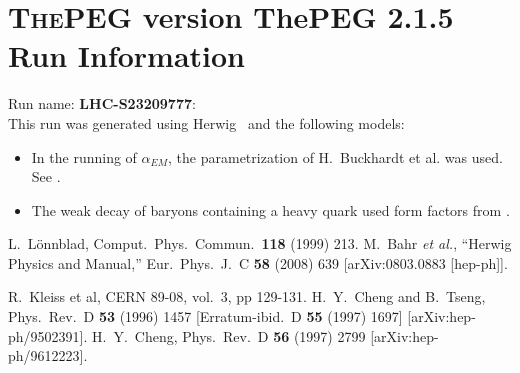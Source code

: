 \documentclass{article}
\begin{document}
\appendix
\section[xxx]{\textsc{ThePEG} version ThePEG 2.1.5 \cite{ThePEG} Run Information}
Run name: \textbf{LHC-S23209777}:\\
This run was generated using Herwig~\cite{Bahr:2008pv} and the following models:
\begin{itemize}
\item In the running of $\alpha_{EM}$, the parametrization of H.~Buckhardt et al. was used. See \cite{KLEISSCERN9808v3pp129}.
\item The weak decay of baryons containing a heavy quark used form factors from \cite{Cheng:1995fe,Cheng:1996cs}.
\end{itemize}

\begin{thebibliography}{99}
 L.~L\"onnblad, Comput.~Phys.~Commun.\ {\bf 118} (1999) 213.
  M.~Bahr {\it et al.},
  ``Herwig Physics and Manual,''
  Eur.\ Phys.\ J.\  C {\bf 58} (2008) 639
  [arXiv:0803.0883 [hep-ph]].

 R.~Kleiss et al, CERN 89-08, vol.~3, pp 129-131.
  H.~Y.~Cheng and B.~Tseng,
  Phys.\ Rev.\  D {\bf 53} (1996) 1457
  [Erratum-ibid.\  D {\bf 55} (1997) 1697]
  [arXiv:hep-ph/9502391].
  H.~Y.~Cheng,
  Phys.\ Rev.\  D {\bf 56} (1997) 2799
  [arXiv:hep-ph/9612223].

\end{thebibliography}
\end{document}
